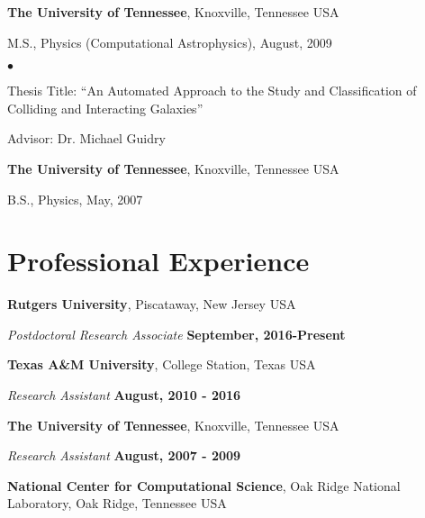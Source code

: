 \documentclass[margin,line, 11pt]{res}
\newenvironment{list1}{
  \begin{list}{\ding{113}}{%
      \setlength{\itemsep}{0in}
      \setlength{\parsep}{0in} \setlength{\parskip}{0in}
      \setlength{\topsep}{0in} \setlength{\partopsep}{0in} 
      \setlength{\leftmargin}{0.17in}}}{\end{list}}
\newenvironment{list2}{
  \begin{list}{$\bullet$}{%
      \setlength{\itemsep}{0in}
      \setlength{\parsep}{0in} \setlength{\parskip}{0in}
      \setlength{\topsep}{0in} \setlength{\partopsep}{0in} 
      \setlength{\leftmargin}{0.2in}}}{\end{list}}
\begin{document}
\begin{resume}
\textbf{The University of Tennessee}, Knoxville, Tennessee USA\\
\vspace*{-.1in}
\begin{list1}
    \item[] M.S., Physics (Computational Astrophysics),  August, 2009
    \begin{list2}
        \vspace*{.05in}
        \item Thesis Title: ``An Automated Approach to the Study and Classification of Colliding and Interacting Galaxies''
        \item Advisor: Dr. Michael Guidry
    \end{list2}
\end{list1}
\vspace*{1mm}

{\bf The University of Tennessee}, Knoxville, Tennessee USA\\
\vspace*{-.1in}
\begin{list1}
    \item[] B.S., Physics,  May, 2007
\end{list1}
\vspace*{1mm}

\section{\sc Professional Experience}
\textbf{Rutgers University}, Piscataway, New Jersey USA

{\em Postdoctoral Research Associate} \hfill \textbf{September, 2016-Present}
\vspace*{1mm}

\textbf{Texas A\&M University}, College Station, Texas USA

{\em Research Assistant} \hfill \textbf{August, 2010 - 2016}
\vspace*{1mm}

\textbf{The University of Tennessee}, Knoxville, Tennessee USA

{\em Research Assistant} \hfill \textbf{August, 2007 - 2009}
\vspace*{1mm}

\textbf{National Center for Computational Science}, Oak Ridge National Laboratory,
Oak Ridge, Tennessee USA


\end{resume}
\end{document}
